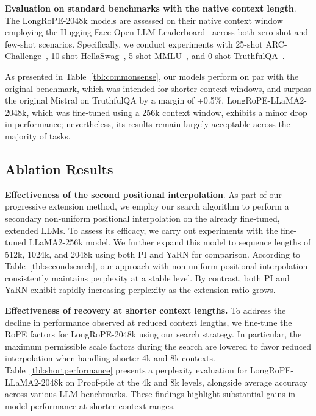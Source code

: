 \textbf{Evaluation on standard benchmarks with the native context length}. The LongRoPE-2048k models are assessed on their native context window employing the Hugging Face Open LLM Leaderboard~\cite{huggingfaceboard} across both zero-shot and few-shot scenarios. Specifically, we conduct experiments with 25-shot ARC-Challenge~\cite{allenai:arc}, 10-shot HellaSwag~\cite{zellers2019hellaswag}, 5-shot MMLU~\cite{mmlu}, and 0-shot TruthfulQA~\cite{lin2021truthfulqa}.

As presented in Table~\ref{tbl:commonsense}, our models perform on par with the original benchmark, which was intended for shorter context windows, and surpass the original Mistral on TruthfulQA by a margin of +0.5\%. LongRoPE-LLaMA2-2048k, which was fine-tuned using a 256k context window, exhibits a minor drop in performance; nevertheless, its results remain largely acceptable across the majority of tasks.

\subsection{Ablation Results}

\textbf{Effectiveness of the second positional interpolation}. As part of our progressive extension method, we employ our search algorithm to perform a secondary non-uniform positional interpolation on the already fine-tuned, extended LLMs. To assess its efficacy, we carry out experiments with the fine-tuned LLaMA2-256k model. We further expand this model to sequence lengths of 512k, 1024k, and 2048k using both PI and YaRN for comparison. According to Table~\ref{tbl:secondsearch}, our approach with non-uniform positional interpolation consistently maintains perplexity at a stable level. By contrast, both PI and YaRN exhibit rapidly increasing perplexity as the extension ratio grows.

\textbf{Effectiveness of recovery at shorter context lengths.} To address the decline in performance observed at reduced context lengths, we fine-tune the RoPE factors for LongRoPE-2048k using our search strategy. In particular, the maximum permissible scale factors during the search are lowered to favor reduced interpolation when handling shorter 4k and 8k contexts. Table~\ref{tbl:shortperformance} presents a perplexity evaluation for LongRoPE-LLaMA2-2048k on Proof-pile at the 4k and 8k levels, alongside average accuracy across various LLM benchmarks. These findings highlight substantial gains in model performance at shorter context ranges.

